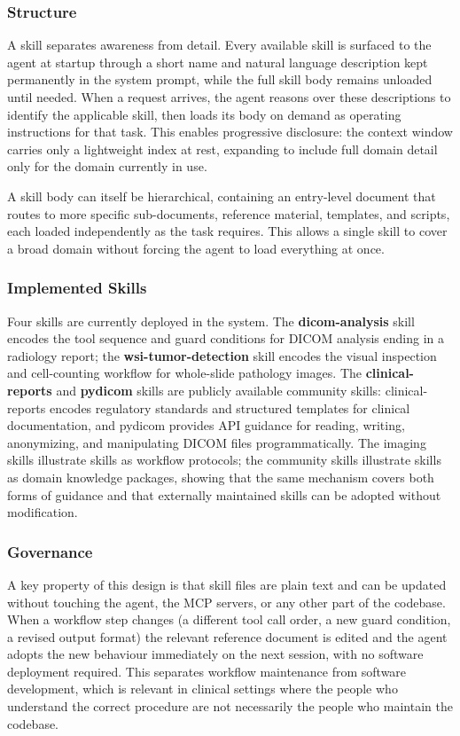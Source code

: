 \documentclass[conference]{IEEEtran}
\begin{document}
\subsubsection{Structure}
A skill separates awareness from detail. Every available skill is
surfaced to the agent at startup through a short name and natural
language description kept permanently in the system prompt, while the
full skill body remains unloaded until needed. When a request arrives,
the agent reasons over these descriptions to identify the applicable
skill, then loads its body on demand as operating instructions for that
task. This enables progressive disclosure: the context window carries
only a lightweight index at rest, expanding to include full domain
detail only for the domain currently in use.

A skill body can itself be hierarchical, containing an entry-level
document that routes to more specific sub-documents, reference
material, templates, and scripts, each loaded independently as the
task requires. This allows a single skill to cover a broad domain
without forcing the agent to load everything at once.

\subsubsection{Implemented Skills}

Four skills are currently deployed in the system. The
\textbf{dicom-analysis} skill encodes the tool sequence and guard
conditions for DICOM analysis ending in a radiology report; the
\textbf{wsi-tumor-detection} skill encodes the visual inspection and
cell-counting workflow for whole-slide pathology images. The
\textbf{clinical-reports} and \textbf{pydicom} skills are publicly
available community skills: clinical-reports encodes
regulatory standards and structured templates for clinical
documentation, and pydicom provides API guidance for reading, writing,
anonymizing, and manipulating DICOM files programmatically. The imaging
skills illustrate skills as workflow protocols; the community skills
illustrate skills as domain knowledge packages, showing that the same
mechanism covers both forms of guidance and that externally maintained
skills can be adopted without modification.


\subsubsection{Governance}

A key property of this design is that skill files are plain text and
can be updated without touching the agent, the MCP servers, or any
other part of the codebase. When a workflow step changes (a
different tool call order, a new guard condition, a revised output
format) the relevant reference document is edited and the agent
adopts the new behaviour immediately on the next session, with no
software deployment required. This separates workflow maintenance from
software development, which is relevant in clinical settings where the
people who understand the correct procedure are not necessarily the
people who maintain the codebase.
\end{document}
